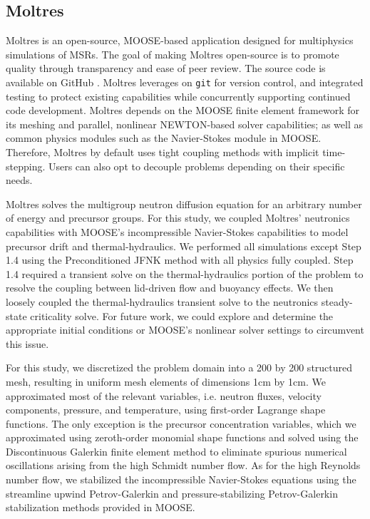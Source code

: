 \subsection{Moltres}

Moltres \cite{lindsay_introduction_2018} is an open-source, \gls{MOOSE}-based
application designed for multiphysics simulations of \glspl{MSR}. The goal of
making Moltres open-source is to promote quality through transparency and
ease of peer review. The source code \cite{lindsay_moltres_2017} is available
on GitHub \cite{lindsay_moltres_2017}. Moltres leverages on \texttt{git} for
version control, and integrated testing to protect existing capabilities while
concurrently supporting continued code development. Moltres depends on the
\gls{MOOSE} finite element framework for its meshing and parallel, nonlinear
NEWTON-based solver capabilities; as well as common physics modules such as the
Navier-Stokes module \cite{peterson_overview_2017} in \gls{MOOSE}. Therefore,
Moltres by default uses tight coupling methods with implicit time-stepping.
Users can also opt to decouple problems depending on their specific needs.

Moltres solves the multigroup neutron diffusion equation for an arbitrary
number of energy and precursor groups. For this study, we coupled Moltres'
neutronics capabilities with \gls{MOOSE}'s incompressible Navier-Stokes
capabilities \cite{peterson_overview_2017} to
model precursor drift and thermal-hydraulics. We performed all simulations
except Step 1.4 using the Preconditioned \gls{JFNK} method with all physics
fully coupled. Step 1.4 required a transient solve on the thermal-hydraulics
portion of the problem to resolve the coupling between lid-driven flow and
buoyancy effects. We then loosely coupled the thermal-hydraulics transient
solve to the neutronics steady-state criticality solve. For future work, we
could explore and determine the appropriate initial conditions or \gls{MOOSE}'s
nonlinear solver settings to circumvent this issue.

For this study, we discretized the problem domain into a 200 by 200 structured
mesh, resulting in uniform mesh elements of dimensions 1cm by 1cm. We
approximated most of the relevant variables, i.e. neutron fluxes, velocity
components, pressure, and temperature, using first-order Lagrange shape
functions. The only exception is the precursor concentration variables, which
we approximated using zeroth-order monomial shape functions and solved using
the Discontinuous Galerkin finite element method to eliminate spurious
numerical oscillations arising from the high Schmidt number flow. As for the
high Reynolds number flow, we stabilized the incompressible Navier-Stokes
equations using the streamline upwind Petrov-Galerkin and pressure-stabilizing
Petrov-Galerkin stabilization methods \cite{peterson_overview_2017} provided in
\gls{MOOSE}.